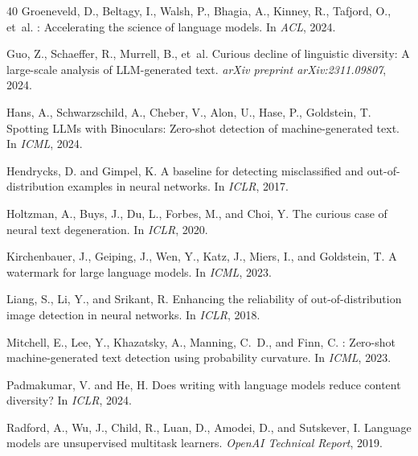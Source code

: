 \documentclass[letterpaper]{article}
\begin{document}
\begin{thebibliography}{40}
Groeneveld, D., Beltagy, I., Walsh, P., Bhagia, A., Kinney, R., Tafjord, O., et~al.
: Accelerating the science of language models.
\newblock In \emph{ACL}, 2024.

Guo, Z., Schaeffer, R., Murrell, B., et~al.
\newblock Curious decline of linguistic diversity: A large-scale analysis of {LLM}-generated text.
\newblock \emph{arXiv preprint arXiv:2311.09807}, 2024.

Hans, A., Schwarzschild, A., Cheber, V., Alon, U., Hase, P., Goldstein, T.
\newblock Spotting {LLM}s with Binoculars: Zero-shot detection of machine-generated text.
\newblock In \emph{ICML}, 2024.

Hendrycks, D. and Gimpel, K.
\newblock A baseline for detecting misclassified and out-of-distribution examples in neural networks.
\newblock In \emph{ICLR}, 2017.

Holtzman, A., Buys, J., Du, L., Forbes, M., and Choi, Y.
\newblock The curious case of neural text degeneration.
\newblock In \emph{ICLR}, 2020.

Kirchenbauer, J., Geiping, J., Wen, Y., Katz, J., Miers, I., and Goldstein, T.
\newblock A watermark for large language models.
\newblock In \emph{ICML}, 2023.

Liang, S., Li, Y., and Srikant, R.
\newblock Enhancing the reliability of out-of-distribution image detection in neural networks.
\newblock In \emph{ICLR}, 2018.

Mitchell, E., Lee, Y., Khazatsky, A., Manning, C.~D., and Finn, C.
: Zero-shot machine-generated text detection using probability curvature.
\newblock In \emph{ICML}, 2023.

Padmakumar, V. and He, H.
\newblock Does writing with language models reduce content diversity?
\newblock In \emph{ICLR}, 2024.

Radford, A., Wu, J., Child, R., Luan, D., Amodei, D., and Sutskever, I.
\newblock Language models are unsupervised multitask learners.
\newblock \emph{OpenAI Technical Report}, 2019.


\end{thebibliography}
\end{document}
